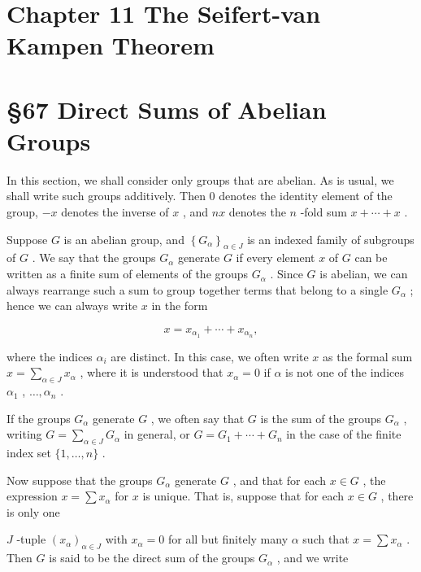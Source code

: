 \documentclass[10pt]{article}
\begin{document}
\section*{Chapter 11 The Seifert-van Kampen Theorem}

\section*{§67 Direct Sums of Abelian Groups}

In this section, we shall consider only groups that are abelian. As is usual, we shall write such groups additively. Then 0 denotes the identity element of the group, \(- x\) denotes the inverse of \(x\) , and \({nx}\) denotes the \(n\) -fold sum \(x + \cdots  + x\) .

Suppose \(G\) is an abelian group, and \({\left\{  {G}_{\alpha }\right\}  }_{\alpha  \in  J}\) is an indexed family of subgroups of \(G\) . We say that the groups \({G}_{\alpha }\) generate \(G\) if every element \(x\) of \(G\) can be written as a finite sum of elements of the groups \({G}_{\alpha }\) . Since \(G\) is abelian, we can always rearrange such a sum to group together terms that belong to a single \({G}_{\alpha }\) ; hence we can always write \(x\) in the form

\[
x = {x}_{{\alpha }_{1}} + \cdots  + {x}_{{\alpha }_{n}},
\]

where the indices \({\alpha }_{i}\) are distinct. In this case, we often write \(x\) as the formal sum \(x = \mathop{\sum }\limits_{{\alpha  \in  J}}{x}_{\alpha }\) , where it is understood that \({x}_{\alpha } = 0\) if \(\alpha\) is not one of the indices \({\alpha }_{1}\) , \(\ldots ,{\alpha }_{n}\) .

If the groups \({G}_{\alpha }\) generate \(G\) , we often say that \(G\) is the sum of the groups \({G}_{\alpha }\) , writing \(G = \mathop{\sum }\limits_{{\alpha  \in  J}}{G}_{\alpha }\) in general, or \(G = {G}_{1} + \cdots  + {G}_{n}\) in the case of the finite index set \(\{ 1,\ldots ,n\}\) .

Now suppose that the groups \({G}_{\alpha }\) generate \(G\) , and that for each \(x \in  G\) , the expression \(x = \sum {x}_{\alpha }\) for \(x\) is unique. That is, suppose that for each \(x \in  G\) , there is only one

\(J\) -tuple \({\left( {x}_{\alpha }\right) }_{\alpha  \in  J}\) with \({x}_{\alpha } = 0\) for all but finitely many \(\alpha\) such that \(x = \sum {x}_{\alpha }\) . Then \(G\) is said to be the direct sum of the groups \({G}_{\alpha }\) , and we write
\end{document}

